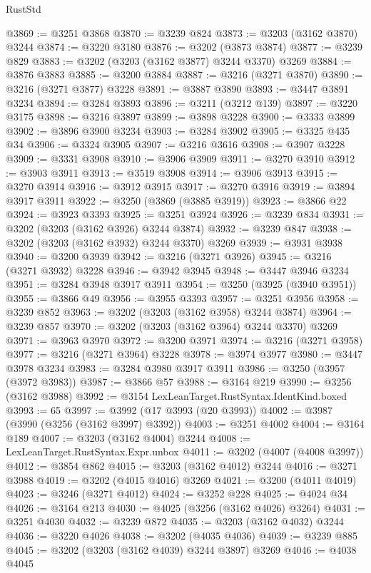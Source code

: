 \begin{lexlean}{RustStd}
\begin{coremodule}
@3869 := @3251 @3868
@3870 := @3239 @824
@3873 := @3203 (@3162 @3870) @3244
@3874 := @3220 @3180
@3876 := @3202 (@3873 @3874)
@3877 := @3239 @829
@3883 := @3202 (@3203 (@3162 @3877) @3244 @3370) @3269
@3884 := @3876 @3883
@3885 := @3200 @3884
@3887 := @3216 (@3271 @3870)
@3890 := @3216 (@3271 @3877) @3228
@3891 := @3887 @3890
@3893 := @3447 @3891 @3234
@3894 := @3284 @3893
@3896 := @3211 (@3212 @139)
@3897 := @3220 @3175
@3898 := @3216 @3897
@3899 := @3898 @3228
@3900 := @3333 @3899
@3902 := @3896 @3900 @3234
@3903 := @3284 @3902
@3905 := @3325 @435 @34
@3906 := @3324 @3905
@3907 := @3216 @3616
@3908 := @3907 @3228
@3909 := @3331 @3908
@3910 := @3906 @3909
@3911 := @3270 @3910
@3912 := @3903 @3911
@3913 := @3519 @3908
@3914 := @3906 @3913
@3915 := @3270 @3914
@3916 := @3912 @3915
@3917 := @3270 @3916
@3919 := @3894 @3917 @3911
@3922 := @3250 (@3869 (@3885 @3919))
@3923 := @3866 @22
@3924 := @3923 @3393
@3925 := @3251 @3924
@3926 := @3239 @834
@3931 := @3202 (@3203 (@3162 @3926) @3244 @3874)
@3932 := @3239 @847
@3938 := @3202 (@3203 (@3162 @3932) @3244 @3370) @3269
@3939 := @3931 @3938
@3940 := @3200 @3939
@3942 := @3216 (@3271 @3926)
@3945 := @3216 (@3271 @3932) @3228
@3946 := @3942 @3945
@3948 := @3447 @3946 @3234
@3951 := @3284 @3948 @3917 @3911
@3954 := @3250 (@3925 (@3940 @3951))
@3955 := @3866 @49
@3956 := @3955 @3393
@3957 := @3251 @3956
@3958 := @3239 @852
@3963 := @3202 (@3203 (@3162 @3958) @3244 @3874)
@3964 := @3239 @857
@3970 := @3202 (@3203 (@3162 @3964) @3244 @3370) @3269
@3971 := @3963 @3970
@3972 := @3200 @3971
@3974 := @3216 (@3271 @3958)
@3977 := @3216 (@3271 @3964) @3228
@3978 := @3974 @3977
@3980 := @3447 @3978 @3234
@3983 := @3284 @3980 @3917 @3911
@3986 := @3250 (@3957 (@3972 @3983))
@3987 := @3866 @57
@3988 := @3164 @219
@3990 := @3256 (@3162 @3988)
@3992 := @3154 LexLeanTarget.RustSyntax.IdentKind.boxed
@3993 := 65
@3997 := @3992 (@17 @3993 (@20 @3993))
@4002 := @3987 (@3990 (@3256 (@3162 @3997) @3392))
@4003 := @3251 @4002
@4004 := @3164 @189
@4007 := @3203 (@3162 @4004) @3244
@4008 := LexLeanTarget.RustSyntax.Expr.unbox
@4011 := @3202 (@4007 (@4008 @3997))
@4012 := @3854 @862
@4015 := @3203 (@3162 @4012) @3244
@4016 := @3271 @3988
@4019 := @3202 (@4015 @4016) @3269
@4021 := @3200 (@4011 @4019)
@4023 := @3246 (@3271 @4012)
@4024 := @3252 @228
@4025 := @4024 @34
@4026 := @3164 @213
@4030 := @4025 (@3256 (@3162 @4026) @3264)
@4031 := @3251 @4030
@4032 := @3239 @872
@4035 := @3203 (@3162 @4032) @3244
@4036 := @3220 @4026
@4038 := @3202 (@4035 @4036)
@4039 := @3239 @885
@4045 := @3202 (@3203 (@3162 @4039) @3244 @3897) @3269
@4046 := @4038 @4045

\end{coremodule}
\end{lexlean}
